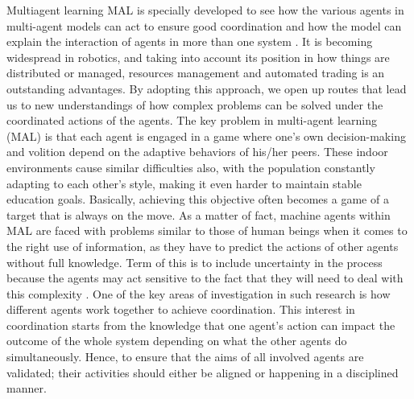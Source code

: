\documentclass[11pt]{article}
\begin{document}
Multiagent learning MAL is specially developed to see how the various agents in multi-agent models can act to ensure good coordination and how the model can explain the interaction of agents in more than one system \cite{busoniu2008comprehensive}. It is becoming widespread in robotics, and taking into account its position in how things are distributed or managed, resources management and automated trading is an outstanding advantages. By adopting this approach, we open up routes that lead us to new understandings of how complex problems can be solved under the coordinated actions of the agents. The key problem in multi-agent learning (MAL) is that each agent is engaged in a game where one's own decision-making and volition depend on the adaptive behaviors of his/her peers. These indoor environments cause similar difficulties also, with the population constantly adapting to each other's style, making it even harder to maintain stable education goals. Basically, achieving this objective often becomes a game of a target that is always on the move. As a matter of fact, machine agents within MAL are faced with problems similar to those of human beings when it comes to the right use of information, as they have to predict the actions of other agents without full knowledge. Term of this is to include uncertainty in the process because the agents may act sensitive to the fact that they will need to deal with this complexity \cite{foerster2016learning}. One of the key areas of investigation in such research is how different agents work together to achieve coordination. This interest in coordination starts from the knowledge that one agent’s action can impact the outcome of the whole system depending on what the other agents do simultaneously. Hence, to ensure that the aims of all involved agents are validated; their activities should either be aligned or happening in a disciplined manner.
\end{document}
